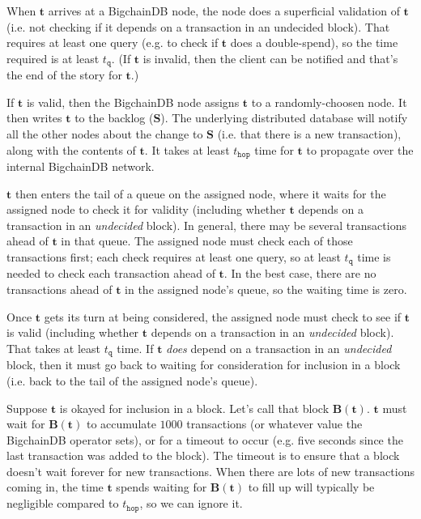 When $\mathbf{t}$ arrives at a BigchainDB node, the node does a superficial validation of $\mathbf{t}$ (i.e. not checking if it depends on a transaction in an undecided block). 
That requires at least one query (e.g. to check if $\mathbf{t}$ does a double-spend), so the time required is at least $t_\mathtt{q}$. 
(If $\mathbf{t}$ is invalid, then the client can be notified and that’s the end of the story for $\mathbf{t}$.)

If $\mathbf{t}$ is valid, then the BigchainDB node assigns $\mathbf{t}$ to a randomly-choosen node. 
It then writes $\mathbf{t}$ to the backlog ($\mathbf{S}$). 
The underlying distributed database will notify all the other nodes about the change to $\mathbf{S}$ (i.e. that there is a new transaction), along with the contents of $\mathbf{t}$. 
It takes at least $t_\mathtt{hop}$ time for $\mathbf{t}$ to propagate over the internal BigchainDB network.

$\mathbf{t}$ then enters the tail of a queue on the assigned node, where it waits for the assigned node to check it for validity (including whether $\mathbf{t}$ depends on a transaction in an \textsf{\textit{undecided}} block). 
In general, there may be several transactions ahead of $\mathbf{t}$ in that queue. 
The assigned node must check each of those transactions first; each check requires at least one query, so at least $t_\mathtt{q}$ time is needed to check each transaction ahead of $\mathbf{t}$. 
In the best case, there are no transactions ahead of $\mathbf{t}$ in the assigned node’s queue, so the waiting time is zero.

Once $\mathbf{t}$ gets its turn at being considered, the assigned node must check to see if $\mathbf{t}$ is valid (including whether $\mathbf{t}$ depends on a transaction in an \textsf{\textit{undecided}} block). 
That takes at least $t_\mathtt{q}$ time. 
If $\mathbf{t}$ \textit{does} depend on a transaction in an \textsf{\textit{undecided}} block, then it must go back to waiting for consideration for inclusion in a block (i.e. back to the tail of the assigned node’s queue).

Suppose $\mathbf{t}$ is okayed for inclusion in a block. 
Let’s call that block $\mathbf{B}(\mathbf{t})$. 
$\mathbf{t}$ must wait for $\mathbf{B}(\mathbf{t})$ to accumulate $1000$ transactions (or whatever value the BigchainDB operator sets), or for a timeout to occur (e.g. five seconds since the last transaction was added to the block). 
The timeout is to ensure that a block doesn’t wait forever for new transactions. 
When there are lots of new transactions coming in, the time $\mathbf{t}$ spends waiting for $\mathbf{B}(\mathbf{t})$ to fill up will typically be negligible compared to $t_\mathtt{hop}$, so we can ignore it.

